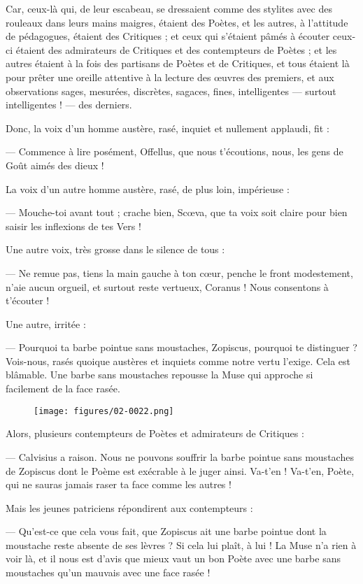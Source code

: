 \documentclass[a4paper, 11pt, oneside, polutonikogreek, french]{article}
\begin{document}
Car, ceux-là qui, de leur escabeau, se dressaient comme des stylites avec des rouleaux dans leurs mains maigres, étaient des Poètes, et les autres, à l'attitude de pédagogues, étaient des Critiques ; et ceux qui s'étaient pâmés à écouter ceux-ci étaient des admirateurs de Critiques et des contempteurs de Poètes ; et les autres étaient à la fois des partisans de Poètes et de Critiques, et tous étaient là pour prêter une oreille attentive à la lecture des œuvres des premiers, et aux observations sages, mesurées, discrètes, sagaces, fines, intelligentes --- surtout intelligentes ! --- des derniers.

Donc, la voix d'un homme austère, rasé, inquiet et nullement applaudi, fit :

--- Commence à lire posément, Offellus, que nous t'écoutions, nous, les gens de Goût aimés des dieux !

La voix d'un autre homme austère, rasé, de plus loin, impérieuse :

--- Mouche-toi avant tout ; crache bien, Scœva, que ta voix soit claire pour bien saisir les inflexions de tes Vers !

Une autre voix, très grosse dans le silence de tous :

--- Ne remue pas, tiens la main gauche à ton cœur, penche le front modestement, n'aie aucun orgueil, et surtout reste vertueux, Coranus ! Nous consentons à t'écouter !

Une autre, irritée :

--- Pourquoi ta barbe pointue sans moustaches, Zopiscus, pourquoi te distinguer ? Vois-nous, rasés quoique austères et inquiets comme notre vertu l'exige. Cela est blâmable. Une barbe sans moustaches repousse la Muse qui approche si facilement de la face rasée.
\begin{figure}[H]
\centering
\texttt{[image: figures/02-0022.png]}
\end{figure}
Alors, plusieurs contempteurs de Poètes et admirateurs de Critiques :

--- Calvisius a raison. Nous ne pouvons souffrir la barbe pointue sans moustaches de Zopiscus dont le Poème est exécrable à le juger ainsi. Va-t'en ! Va-t'en, Poète, qui ne sauras jamais raser ta face comme les autres !

Mais les jeunes patriciens répondirent aux contempteurs :

--- Qu'est-ce que cela vous fait, que Zopiscus ait une barbe pointue dont la moustache reste absente de ses lèvres ? Si cela lui plaît, à lui ! La Muse n'a rien à voir là, et il nous est d'avis que mieux vaut un bon Poète avec une barbe sans moustaches qu'un mauvais avec une face rasée !
\end{document}
